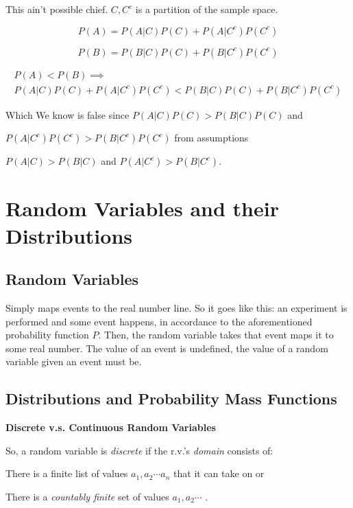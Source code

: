 \documentclass{article}
\begin{document}
			This ain't possible chief. $C, C^c$ is a partition of the sample space. 
			
			$$P(A) = P(A\vert C)P(C) + P(A\vert C^c)P(C^c)$$
			
			$$P(B) = P(B\vert C)P(C) + P(B\vert C^c)P(C^c)$$
			
			\begin{multline*}
			 P(A) < P(B) \implies \\ P(A\vert C)P(C) + P(A\vert C^c)P(C^c) < P(B\vert C)P(C) + P(B\vert C^c)P(C^c)
			\end{multline*}
			
			Which We know is false since $ P(A\vert C)P(C) > P(B\vert C)P(C)$ and 
			
			$P(A\vert C^c)P(C^c) > P(B\vert C^c)P(C^c)$ from assumptions 
			
			$P(A\vert C) > P(B\vert C)$ and $P(A\vert C^c) > P(B\vert C^c)$.
			

\newpage

\section{Random Variables and their Distributions}

	\subsection{Random Variables}
	
		Simply maps events to the real number line. So it goes like this: an experiment is performed and some event happens, in accordance to the aforementioned probability function $P$. Then, the random variable takes that event maps it to some real number. The value of an event is undefined, the value of a random variable given an event must be.
		
	\subsection{Distributions and Probability Mass Functions}
	
		\textbf{Discrete v.s. Continuous Random Variables}
		
			So, a random variable is \textit{discrete} if the r.v.'s \textit{domain} consists of:
			
			There is a finite list of values $a_1, a_2\cdots a_n$ that it can take on or
			
			There is a \textit{countably finite} set of values $a_1, a_2\cdots$ .
			
\end{document}
